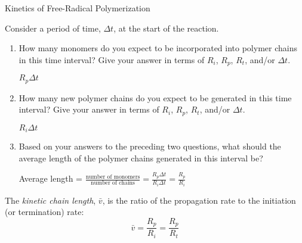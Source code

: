 \begin{activity}{Kinetics of Free-Radical Polymerization}
\begin{ctqs}
	\question Consider a period of time, $\Delta t$, at the start of the reaction.
	
		\begin{enumerate}
			
			\item How many monomers do you expect to be incorporated into polymer chains in this time interval?  Give your answer in terms of $R_i$, $R_p$, $R_t$, and/or $\Delta t$.
			
				\begin{solution}[0.5in]
				
					$R_p \Delta t$
					
				\end{solution}
			
			\item How many new polymer chains do you expect to be generated in this time interval?  Give your answer in terms of $R_i$, $R_p$, $R_t$, and/or $\Delta t$.
			
				\begin{solution}[0.5in]
				
					$R_i \Delta t$
					
				\end{solution}
			
			\item Based on your answers to the preceding two questions, what should the average length of the polymer chains generated in this interval be?
			
				\begin{solution}[0.5in]
				
					Average length = $\frac{\text{number of monomers}}{\text{number of chains}} = \frac{R_p\Delta t}{R_i \Delta t} = \frac{R_p}{R_i}$				
				
				\end{solution}
				
		\end{enumerate}
	
\end{ctqs}

\begin{infobox}
	The \emph{kinetic chain length}, $\bar v$, is the ratio of the propagation rate to the initiation (or termination) rate:
	\begin{equation*}
		\bar v = \frac{R_p}{R_i} = \frac{R_p}{R_t}
	\end{equation*}
\end{infobox}

\begin{ctqs}


\end{ctqs}
\end{activity}
